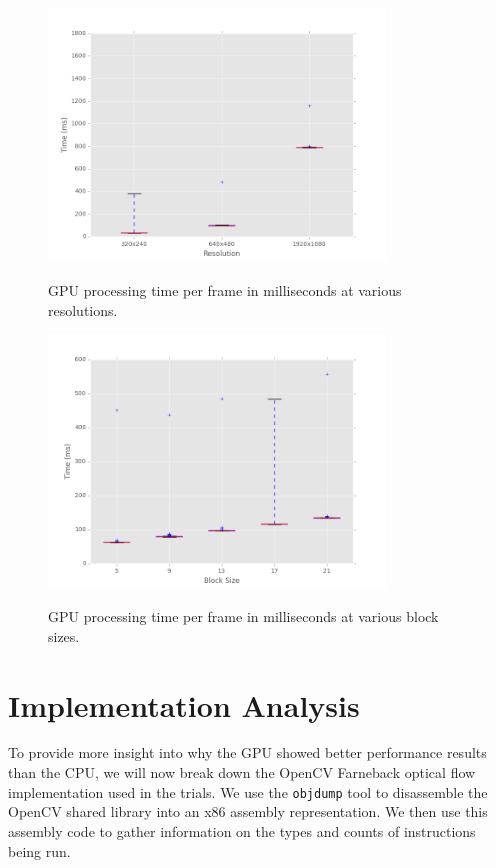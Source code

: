 \documentclass[12pt,letterpaper]{article}
\begin{document}
\begin{figure}[H]
  \centering
    \includegraphics[width=0.8\textwidth]{img/gpu_resolution.png}
  \label{fig:gpures}
  \caption{GPU processing time per frame in milliseconds at various resolutions.}
\end{figure}

\begin{figure}[H]
  \centering
    \includegraphics[width=0.8\textwidth]{img/gpu_blocksize.png}
  \label{fig:gpublock}
  \caption{GPU processing time per frame in milliseconds at various block sizes.}
\end{figure}

\section{Implementation Analysis}
To provide more insight into why the GPU showed better performance results than
the CPU, we will now break down the OpenCV Farneback optical flow implementation
used in the trials. We use the \texttt{objdump} tool to disassemble the OpenCV
shared library into an x86 assembly representation. We then use this assembly
code to gather information on the types and counts of instructions being run.
\end{document}
